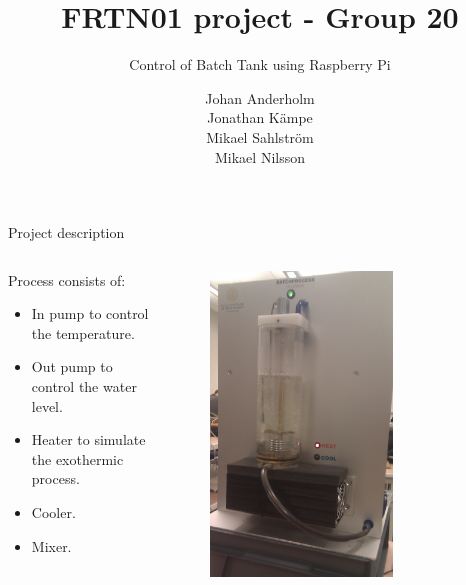 \documentclass{beamer}
\begin{document}
\title{FRTN01 project - Group 20}
\subtitle{Control of Batch Tank using Raspberry Pi}
\author{Johan Anderholm \\ Jonathan Kämpe \\ Mikael Sahlström \\ Mikael Nilsson}

\begin{frame}[plain]
  \titlepage
\end{frame}

\begin{frame}{Project description}
\begin{columns}[T]
    \begin{column}{.55\textwidth}
        Process consists of:
        \begin{itemize}
            \item In pump to control the temperature.
            \item Out pump to control the water level.
            \item Heater to simulate the exothermic process.
            \item Cooler.
            \item Mixer.
        \end{itemize}
    \end{column}
    \begin{column}{.45\textwidth}

        \begin{figure}[H]
           \centering
           \includegraphics[width=0.7\textwidth]{batchprocess.jpg}
        \end{figure}


\end{column}
\end{columns}
\end{frame}
\end{document}
